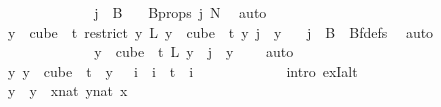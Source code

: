 \begin{isabellebody}
\ \ \ \ \ \ \ \ \ \ \isamarkupfalse%
\ \isamarkupfalse%
\ {\isachardoublequoteopen}j\ {\isasymin}\ B\ {}{\isachardoublequoteclose}\ \isamarkupfalse%
\ B{\isacharunderscore}{\kern0pt}props\ {\isacartoucheopen}j\ {\isacharless}{\kern0pt}N{\isacharprime}{\kern0pt}{\isacartoucheclose}\ \isamarkupfalse%
\ auto\isanewline
\ \ \ \ \ \ \ \ \ \ \isamarkupfalse%
\ \isamarkupfalse%
\ {\isachardoublequoteopen}{\isasymforall}y\ {\isasymin}\ cube\ {}\ t{\isachardot}{\kern0pt}\ {\isacharparenleft}{\kern0pt}{\isacharparenleft}{\kern0pt}restrict\ {\isacharparenleft}{\kern0pt}{\isasymlambda}y{\isachardot}{\kern0pt}\ L\ {\isacharparenleft}{\kern0pt}y\ {}{\isacharparenright}{\kern0pt}{\isacharparenright}{\kern0pt}\ {\isacharparenleft}{\kern0pt}cube\ {}\ t{\isacharparenright}{\kern0pt}{\isacharparenright}{\kern0pt}\ y{\isacharparenright}{\kern0pt}\ j\ {\isacharequal}{\kern0pt}\ y\ {}{\isachardoublequoteclose}\ \isamarkupfalse%
\ {\isacartoucheopen}j\ {\isasymin}\ B\ {}{\isacartoucheclose}\ Bf{\isacharunderscore}{\kern0pt}defs\ \isamarkupfalse%
\ auto\isanewline
\ \ \ \ \ \ \ \ \ \ \isamarkupfalse%
\ \isamarkupfalse%
\ {\isachardoublequoteopen}{\isasymforall}y\ {\isasymin}\ cube\ {}\ t{\isachardot}{\kern0pt}\ L\ {\isacharparenleft}{\kern0pt}y\ {}{\isacharparenright}{\kern0pt}\ j\ {\isacharequal}{\kern0pt}\ y\ {}{\isachardoublequoteclose}\ \ \isamarkupfalse%
\ auto\isanewline
\ \ \ \ \ \ \ \ \ \ \isamarkupfalse%
\ \isamarkupfalse%
\ {\isachardoublequoteopen}{\isasymexists}{\isacharbang}{\kern0pt}y{\isachardot}{\kern0pt}\ y\ {\isasymin}\ cube\ {}\ t\ {\isasymand}\ y\ {}\ {\isacharequal}{\kern0pt}\ i{\isachardoublequoteclose}\ \ {\isachardoublequoteopen}i\ {\isacharless}{\kern0pt}\ t{\isachardoublequoteclose}\ \ i\ \isanewline
\ \ \ \ \ \ \ \ \ \ \isamarkupfalse%
\ {\isacharparenleft}{\kern0pt}intro\ ex{}I{\isacharunderscore}{\kern0pt}alt{\isacharparenright}{\kern0pt}\isanewline
\ \ \ \ \ \ \ \ \ \ \ \ \isamarkupfalse%
\ y\ \ {\isachardoublequoteopen}y\ {\isasymequiv}\ {\isacharparenleft}{\kern0pt}{\isasymlambda}x{\isacharcolon}{\kern0pt}{\isacharcolon}{\kern0pt}nat{\isachardot}{\kern0pt}\ {\isasymlambda}y{\isasymin}{\isacharbraceleft}{\kern0pt}{\isachardot}{\kern0pt}{\isachardot}{\kern0pt}{\isacharless}{\kern0pt}{}{\isacharcolon}{\kern0pt}{\isacharcolon}{\kern0pt}nat{\isacharbraceright}{\kern0pt}{\isachardot}{\kern0pt}\ x{\isacharparenright}{\kern0pt}{\isachardoublequoteclose}\ \isanewline

\end{isabellebody}
